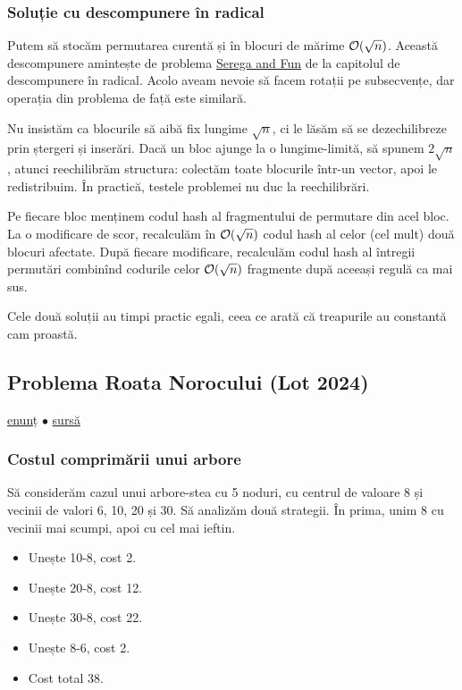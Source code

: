 \documentclass[../main.tex]{subfiles}
\begin{document}
\subsubsection*{Soluție cu descompunere în radical}

Putem să stocăm permutarea curentă și în blocuri de mărime $\mathcal{O}(\sqrt{n})$. Această descompunere amintește de problema \hyperref[problem:serega-and-fun]{Serega and Fun} de la capitolul de descompunere în radical. Acolo aveam nevoie să facem rotații pe subsecvențe, dar operația din problema de față este similară.

Nu insistăm ca blocurile să aibă fix lungime $\sqrt{n}$, ci le lăsăm să se dezechilibreze prin ștergeri și inserări. Dacă un bloc ajunge la o lungime-limită, să spunem $2 \sqrt{n}$, atunci reechilibrăm structura: colectăm toate blocurile într-un vector, apoi le redistribuim. În practică, testele problemei nu duc la reechilibrări.

Pe fiecare bloc menținem codul hash al fragmentului de permutare din acel bloc. La o modificare de scor, recalculăm în $\mathcal{O}(\sqrt{n})$ codul hash al celor (cel mult) două blocuri afectate. După fiecare modificare, recalculăm codul hash al întregii permutări combinînd codurile celor $\mathcal{O}(\sqrt{n})$ fragmente după aceeași regulă ca mai sus.

Cele două soluții au timpi practic egali, ceea ce arată că treapurile au constantă cam proastă.


\subsection{Problema Roata Norocului (Lot 2024)}
\label{problem:roata-norocului}

\href{https://kilonova.ro/problems/2804}{enunț}
$\bullet$
\hyperref[code:roata-norocului]{sursă}

\subsubsection*{Costul comprimării unui arbore}

Să considerăm cazul unui arbore-stea cu 5 noduri, cu centrul de valoare 8 și vecinii de valori 6, 10, 20 și 30. Să analizăm două strategii. În prima, unim 8 cu vecinii mai scumpi, apoi cu cel mai ieftin.

\begin{itemize}
  \item Unește 10-8, cost 2.
  \item Unește 20-8, cost 12.
  \item Unește 30-8, cost 22.
  \item Unește 8-6, cost 2.
  \item Cost total 38.
\end{itemize}
\end{document}

